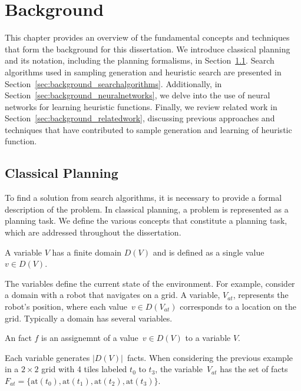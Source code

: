\chapter{Background}
\label{sec:preliminaries}

This chapter provides an overview of the fundamental concepts and techniques that form the background for this dissertation. We introduce classical planning and its notation, including the planning formalisms, in Section~\ref{sec:background_classicalplanning}. Search algorithms used in sampling generation and heuristic search are presented in Section~\ref{sec:background_searchalgorithms}. Additionally, in Section~\ref{sec:background_neuralnetworks}, we delve into the use of neural networks for learning heuristic functions. Finally, we review related work in Section~\ref{sec:background_relatedwork}, discussing previous approaches and techniques that have contributed to sample generation and learning of heuristic function.

\section{Classical Planning}
\label{sec:background_classicalplanning}

To find a solution from search algorithms, it is necessary to provide a formal description of the problem. In classical planning, a problem is represented as a planning task. We define the various concepts that constitute a planning task, which are addressed throughout the dissertation.

\begin{definition}[Variable]\label{def:variable}
    A variable $V$ has a finite domain $D(V)$ and is defined as a single value~$v \in D(V)$.
\end{definition}

The variables define the current state of the environment. For example, consider a domain with a robot that navigates on a grid. A variable, $V_{at}$, represents the robot's position, where each value~$v \in D(V_{at})$ corresponds to a location on the grid. Typically a domain has several variables.

\begin{definition}[Fact]\label{def:fact}
    An fact $f$ is an assignemnt of a value~$v \in D(V)$ to a variable $V$.
\end{definition}

Each variable generates $|D(V)|$~facts. When considering the previous example in a $2 \times 2$ grid with 4 tiles labeled $t_0$ to $t_3$, the variable~$V_{at}$ has the set of facts~$F_{at}=\{\text{at}(t_0),\text{at}(t_1),\text{at}(t_2),\text{at}(t_3)\}$.

